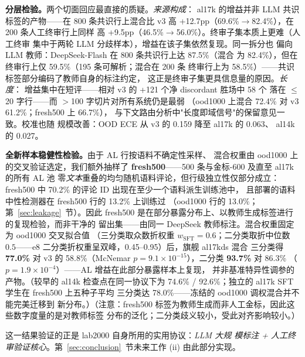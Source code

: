 \documentclass[11pt,a4paper]{article}
\begin{document}
\textbf{分层检验。}两个切面回应最直接的质疑。\emph{来源构成}：
al17k 的增益并非 LLM 共识标签的产物——在 800 条共识行上混合比
v3 高 +12.7pp（69.6\%$\to$82.4\%），在 200 条人工终审行上同样
高 +9.5pp（46.5\%$\to$56.0\%）。终审子集本质上更难（人工终审
集中于两轮 LLM 分歧样本），增益在该子集依然复现。同一拆分也
偏向 LLM 教师：DeepSeek-Flash 在 800 条共识行上达 87.5\%（混合
为 82.4\%），但在终审行上仅 59.5\%（195 条可解析；混合在 200 条
终审行上为 58.5\%）——共识标签部分编码了教师自身的标注约定，
这正是终审子集更具信息量的原因。\emph{长度}：
增益集中在短评——相对 v3 的 +121 个净 discordant 胜场中 58 个
落在 $\le$20 字行——而 $>$100 字切片对所有系统仍是最弱
（ood1000 上混合 72.4\% 对 v3 61.2\%；fresh500 上 66.7\%），
与下文路由分析中"长度即域信号"的保留意见一致。校准也随
规模改善：OOD ECE 从 v3 的 0.159 降至 al17k 的 0.063、
al14k 的 0.027。

\textbf{全新样本稳健性检验。}由于 AL 行按语料不确定性采样、
混合权重由 ood1000 上的交叉验证选定，我们额外抽样了
\textbf{fresh500}——500 条与金标-600 及直至 al17k 的所有 AL 池
零\emph{文本}重叠的均匀随机语料评论，但行级独立性仅部分成立：
fresh500 中 70.2\% 的评论 ID 出现在至少一个语料派生训练池中，
且部署的语料中性检测器在 fresh500 行的 13.2\% 上训练过
（ood1000 行的 13.0\%；第~\ref{sec:leakage}~节）。因此 fresh500
是在部分暴露分布上、以教师生成标签进行的复现检验，而非干净的
留出集——由同一 DeepSeek 教师标注。混合权重固定为 ood1000 交叉拟合值
（三分类取众数折权重 $w_{\mathrm{SFT}}{=}0.6$；二分类取折中位数
$0.5$——e8 二分类折权重呈双峰，0.45--0.95）后，旗舰 al17kds 混合
三分类得 \textbf{77.0\%} 对 v3 的 58.8\%（McNemar
$p = 9.1\times10^{-15}$），二分类 \textbf{93.7\%} 对 86.3\%
（$p = 1.9\times10^{-4}$）——AL 增益在此部分暴露样本上复现，
并非基准特异性调参的产物。（较早的 al14k 检查点在同一协议下为
74.6\% / 92.6\%；独立的 al17k SFT 学生在 fresh500 上五种子平均
三分类达 78.0\%——冻结的 ood1000 调权混合并不能完美迁移到
新分布。）（注意：fresh500
标签为教师生成而非人工金标，因此这些数字度量的是对教师标签
分布的泛化；二分类歧义较小，受此对齐影响较小。）

这一结果验证的正是 lab2000 自身所用的实用协议：\emph{LLM 大规
模标注 + 人工终审验证核心}。第~\ref{sec:conclusion}~节未来工作
(ii) 由此部分实现。
\end{document}
